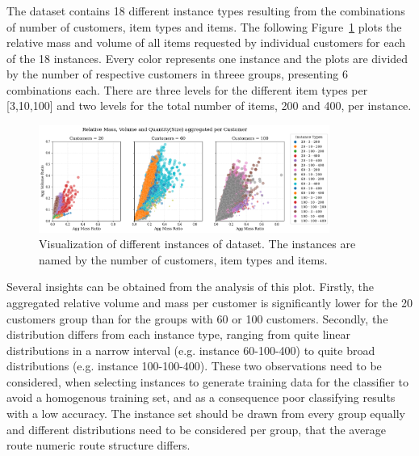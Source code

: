 \subsubsection{\krebsADataSetText}

The dataset contains 18 different instance types resulting from the combinations
of number of customers, item types and items. The following Figure~\ref{fig:krebs_dataset_analysis_detailes} plots
the relative mass and volume of all items requested by individual customers for each of the 18 instances. Every color
represents one instance and the plots are divided by the number of respective customers in threee groups, presenting
6 combinations each. There are three levels for the different item types per [3,10,100] and two levels for the total
number of items, 200 and 400, per instance.

\begin{figure}[ht]
    \centering
    \includegraphics[width=0.85\textwidth]{pictures/krebs_instances_detailed.png}
    \caption[Visualization of different instances of \textcite{krebs_advanced_2021} dataset.]{Visualization of different instances of \krebsADataSetText dataset.
        The instances are named by the number of customers, item types and items.}
    \label{fig:krebs_dataset_analysis_detailes}
\end{figure}

Several insights can be obtained from the analysis of this plot. Firstly, the aggregated relative
volume and mass per customer is significantly lower for the 20 customers group than for the groups with 60 or 100 customers.
Secondly, the distribution differs from each instance type, ranging from quite linear distributions in a narrow
interval (e.g. instance 60-100-400) to quite broad distributions (e.g. instance 100-100-400). These two observations need to be considered,
when selecting instances to generate training data for the classifier to avoid a homogenous training set, and
as a consequence poor classifying results with a low accuracy. The instance set should be drawn from every group equally and
different distributions need to be considered per group, that the average route numeric route structure differs.

